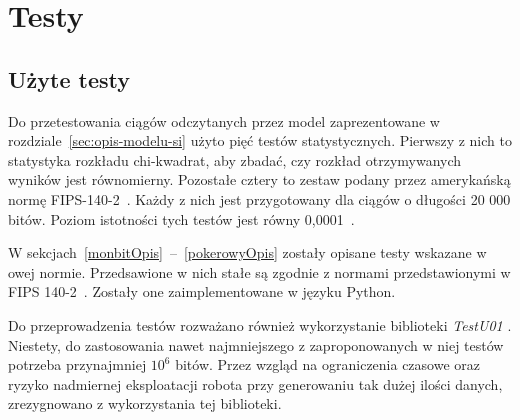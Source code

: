 \chapter{Testy}\label{ch:testy}

\section{Użyte testy}\label{testyOpis}

Do przetestowania ciągów odczytanych przez model zaprezentowane w rozdziale~\ref{sec:opis-modelu-si} użyto pięć
testów statystycznych. Pierwszy z nich to statystyka rozkładu chi-kwadrat, aby zbadać, czy rozkład otrzymywanych 
wyników jest równomierny. Pozostałe cztery to zestaw podany przez amerykańską normę FIPS-140-2~\cite{NIST2001}. Każdy z nich
jest przygotowany dla ciągów o długości 20 000 bitów. Poziom istotności tych testów jest równy 0{,}0001~\cite{Kotulski2001}.


W sekcjach~\ref{monbitOpis}~--~\ref{pokerowyOpis} zostały opisane testy wskazane w owej normie. Przedsawione w nich stałe
są zgodnie z normami przedstawionymi w FIPS 140-2~\cite{NIST2001}. Zostały one zaimplementowane w języku Python.
\par
Do przeprowadzenia testów rozważano również wykorzystanie biblioteki \textit{TestU01} \cite{TestU01}. Niestety, do zastosowania nawet 
najmniejszego z zaproponowanych w niej testów potrzeba przynajmniej \begin{math} 10^6 \end{math} bitów. Przez 
wzgląd na ograniczenia czasowe oraz ryzyko nadmiernej eksploatacji robota przy generowaniu tak dużej ilości danych, 
zrezygnowano z wykorzystania tej biblioteki.


